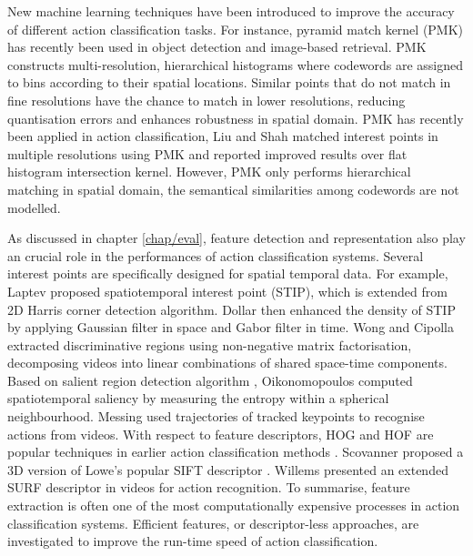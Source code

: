 New machine learning techniques have been introduced to improve the accuracy of different action classification tasks.  
For instance, pyramid match kernel (PMK) \cite{Grauman2005} has recently been used in object detection and image-based retrieval. PMK constructs multi-resolution, hierarchical histograms where codewords are assigned to bins according to their spatial locations. Similar points that do not match in fine resolutions have the chance to match in lower resolutions, reducing quantisation errors and enhances robustness in spatial domain. PMK has recently been applied in action classification, Liu and Shah \cite{Liu2008} matched interest points in multiple resolutions using PMK and reported improved results over flat histogram intersection kernel. 
However, PMK only performs hierarchical matching in spatial domain, the semantical similarities among codewords are not modelled.  

As discussed in chapter \ref{chap/eval}, feature detection and representation also play an crucial role in the performances of action classification systems. Several interest points are specifically designed for spatial temporal data. For example, Laptev \cite{Laptev2005} proposed spatiotemporal interest point (STIP), which is extended from 2D Harris corner detection algorithm. Dollar \etal \cite{Dollar2005} then enhanced the density of STIP by applying Gaussian filter in space and Gabor filter in time.  
Wong and Cipolla \cite{Wong2007a} extracted discriminative regions using non-negative matrix factorisation, decomposing videos into linear combinations of shared space-time components.
Based on salient region detection algorithm \cite{Mikolajczyk2004}, Oikonomopoulos \etal \cite{Oikonomopoulos2005} computed spatiotemporal saliency by measuring the entropy within a spherical neighbourhood. Messing \etal \cite{Messing2009} used trajectories of tracked keypoints to recognise actions from videos. 
With respect to feature descriptors, HOG and HOF are popular techniques in earlier action classification methods \cite{Dollar2005, Niebles2008, Schuldt2004}. Scovanner \etal \cite{Scovanner2007} proposed a 3D version of Lowe's popular SIFT descriptor \cite{Lowe2004}. Willems \etal \cite{Willems2009} presented an extended SURF descriptor in videos for action recognition.  
To summarise, feature extraction is often one of the most computationally expensive processes in action classification systems. Efficient features, or descriptor-less approaches, are investigated to improve the run-time speed of action classification.  

